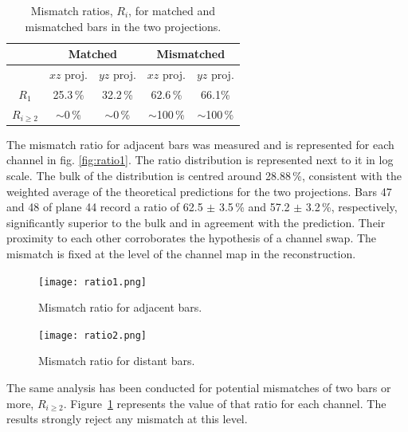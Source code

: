 \documentclass[a4paper,11pt]{article}
\begin{document}
\begin{table}[!h]
 \centering
 \begin{tabular}{c|c|c|c|c}
  & \multicolumn{2}{c|}{Matched} & \multicolumn{2}{c}{Mismatched}  \\
  \hline
  & $xz$ proj. & $yz$ proj. & $xz$ proj. & $yz$ proj. \\
  \hline
  $R_1$ & 25.3\,\% & 32.2\,\% & 62.6\,\% & 66.1\%  \\
  $R_{i\geq2}$ & $\sim$0\,\% & $\sim$0\,\% & $\sim$100\,\% & $\sim$100\,\%
 \end{tabular}
 \caption{Mismatch ratios, $R_i$, for matched and mismatched bars in the two projections.}
 \label{tab:mismatch_ratio}
\end{table}

The mismatch ratio for adjacent bars was measured and is represented for each channel in fig. \ref{fig:ratio1}. The ratio distribution is represented next
to it in log scale. The bulk of the distribution is centred around 28.88\,\%, consistent with the weighted average of the theoretical predictions for the two
projections. Bars 47  and 48 of plane 44 record a ratio of 62.5 $\pm$ 3.5\,\% and 57.2 $\pm$ 3.2\,\%, respectively, significantly superior to the bulk and in
agreement with the prediction. Their proximity to each other corroborates the hypothesis of a channel swap. The mismatch is fixed at the level of the channel
map in the reconstruction.

\begin{figure}[htr!]
  \begin{minipage}[b]{.49\textwidth}
   \centering
   \texttt{[image: ratio1.png]}
   \caption{Mismatch ratio for adjacent bars.}
   \label{fig:ratio1}
  \end{minipage}
  \begin{minipage}[b]{.49\textwidth}
   \centering
   \texttt{[image: ratio2.png]}
   \caption{Mismatch ratio for distant bars.}
   \label{fig:ratio2}
  \end{minipage}
\end{figure}

The same analysis has been conducted for potential mismatches of two bars or more, $R_{i\geq2}$. Figure~\ref{fig:ratio2} represents the value of that ratio for each
channel. The results strongly reject any mismatch at this level.
\end{document}
